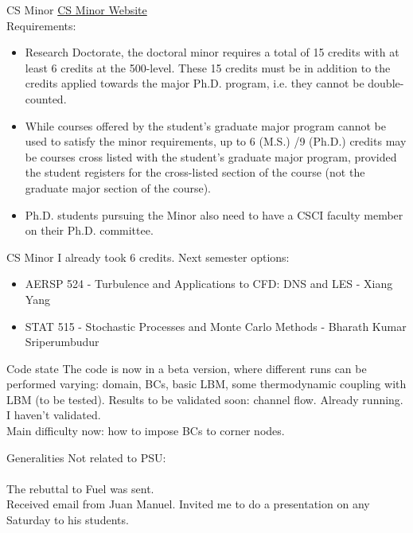 \documentclass{beamer}
\begin{document}
	\begin{frame}{CS Minor}
		\href{http://www.csci.psu.edu/}{\color{blue}CS Minor Website}\\
		Requirements:
		\begin{itemize}
			\small
			\item Research Doctorate, the doctoral minor requires a total of 15 credits with at least 6 credits at the 500-level.  These 15 credits must be in addition to the credits applied towards the major Ph.D. program, i.e. they cannot be double-counted. 
			
			\item While courses offered by the student’s graduate major program cannot be used to satisfy the minor requirements, up to 6 (M.S.) /9 (Ph.D.) credits may be courses cross listed with the student’s graduate major program, provided the student registers for the cross-listed section of the course (not the graduate major section of the course).
			
			\item Ph.D. students pursuing the Minor also need to have a CSCI faculty member on their Ph.D. committee.   
		\end{itemize}
	\end{frame}
	
	\begin{frame}{CS Minor}
		I already took 6 credits. Next semester options:
		\begin{itemize}
			\item AERSP 524 - Turbulence and Applications to CFD: DNS and LES - Xiang Yang
			\item STAT 515 - Stochastic Processes and Monte Carlo Methods - Bharath Kumar Sriperumbudur
		\end{itemize}
		
	\end{frame}
	
	\begin{frame}{Code state}
		The code is now in a beta version, where different runs can be performed varying: domain, BCs, basic LBM, some thermodynamic coupling with LBM (to be tested).
		Results to be validated soon: channel flow. Already running. I haven't validated.\\
		Main difficulty now: how to impose BCs to corner nodes.
	\end{frame}
	
	\begin{frame}{Generalities}
		Not related to PSU:\\~\\
		The rebuttal to Fuel was sent. \\
		Received email from Juan Manuel. Invited me to do a presentation on any Saturday to his students.
	\end{frame}
\end{document}
